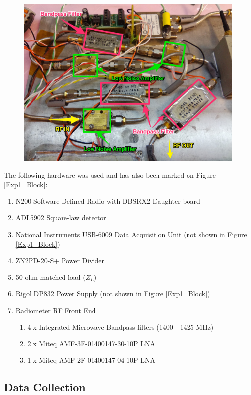 {\begin{figure}[h!tb] \centering
\includegraphics[width=\textwidth]{Images/ISU_RF_noted.jpg}
\label{ISURF}
\end{figure}
}

The following hardware was used and has also been marked on Figure \ref{Exp1_Block}:

\begin{enumerate}
\item N200 Software Defined Radio with DBSRX2 Daughter-board
\item ADL5902 Square-law detector
\item National Instruments USB-6009 Data Acquisition Unit (not shown in Figure \ref{Exp1_Block})
\item ZN2PD-20-S+ Power Divider
\item 50-ohm matched load ($Z_L$)
\item Rigol DP832 Power Supply (not shown in Figure \ref{Exp1_Block})
\item Radiometer RF Front End
\begin{enumerate}
\item 4 x Integrated Microwave Bandpass filters (1400 - 1425 MHz)
\item 2 x Miteq AMF-3F-01400147-30-10P LNA
\item 1 x Miteq AMF-2F-01400147-04-10P LNA
\end{enumerate}
\end{enumerate}

\subsection{Data Collection}\label{exp1_data}

